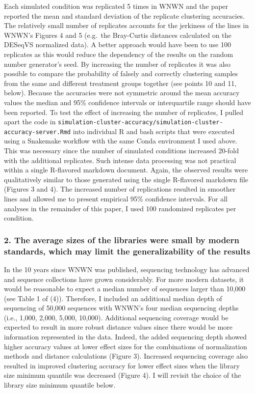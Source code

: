 \documentclass[
]{article}
\begin{document}
Each simulated condition was replicated 5 times in WNWN and the paper
reported the mean and standard deviation of the replicate clustering
accuracies. The relatively small number of replicates accounts for the
jerkiness of the lines in WNWN's Figures 4 and 5 (e.g.~the Bray-Curtis
distances calculated on the DESeqVS normalized data). A better approach
would have been to use 100 replicates as this would reduce the
dependency of the results on the random number generator's seed. By
increasing the number of replicates it was also possible to compare the
probability of falsely and correctly clustering samples from the same
and different treatment groups together (see points 10 and 11, below).
Because the accuracies were not symmetric around the mean accuracy
values the median and 95\% confidence intervals or interquartile range
should have been reported. To test the effect of increasing the number
of replicates, I pulled apart the code in
\texttt{simulation-cluster-accuracy/simulation-cluster-accuracy-server.Rmd}
into individual R and bash scripts that were executed using a Snakemake
workflow with the same Conda environment I used above. This was
necessary since the number of simulated conditions increased 20-fold
with the additional replicates. Such intense data processing was not
practical within a single R-flavored markdown document. Again, the
observed results were qualitatively similar to those generated using the
single R-flavored markdown file (Figures 3 and 4). The increased number
of replications resulted in smoother lines and allowed me to present
empirical 95\% confidence intervals. For all analyses in the remainder
of this paper, I used 100 randomized replicates per condition.

\hypertarget{the-average-sizes-of-the-libraries-were-small-by-modern-standards-which-may-limit-the-generalizability-of-the-results}{%
\subsubsection{2. The average sizes of the libraries were small by
modern standards, which may limit the generalizability of the
results}\label{the-average-sizes-of-the-libraries-were-small-by-modern-standards-which-may-limit-the-generalizability-of-the-results}}

In the 10 years since WNWN was published, sequencing technology has
advanced and sequence collections have grown considerably. For more
modern datasets, it would be reasonable to expect a median number of
sequences larger than 10,000 (see Table 1 of (4)). Therefore, I included
an additional median depth of sequencing of 50,000 sequences with WNWN's
four median sequencing depths (i.e., 1,000, 2,000, 5,000, 10,000).
Additional sequencing coverage would be expected to result in more
robust distance values since there would be more information represented
in the data. Indeed, the added sequencing depth showed higher accuracy
values at lower effect sizes for the combinations of normalization
methods and distance calculations (Figure 3). Increased sequencing
coverage also resulted in improved clustering accuracy for lower effect
sizes when the library size minimum quantile was decreased (Figure 4). I
will revisit the choice of the library size minimum quantile below.
\end{document}
